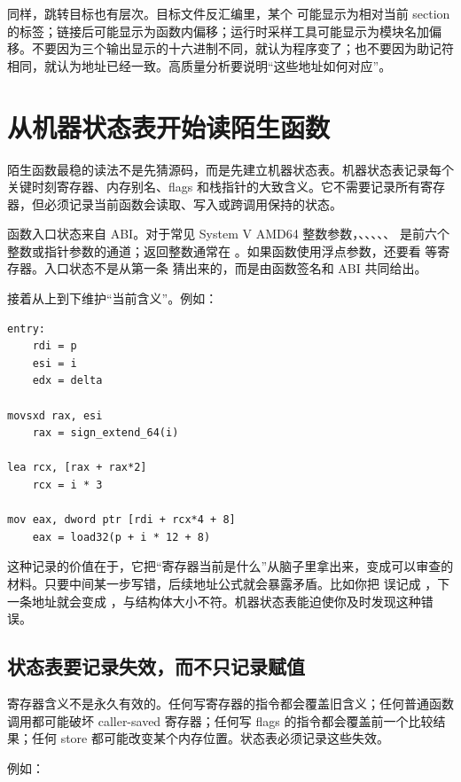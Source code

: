 同样，跳转目标也有层次。目标文件反汇编里，某个  可能显示为相对当前 section 的标签；链接后可能显示为函数内偏移；运行时采样工具可能显示为模块名加偏移。不要因为三个输出显示的十六进制不同，就认为程序变了；也不要因为助记符相同，就认为地址已经一致。高质量分析要说明“这些地址如何对应”。

\section{从机器状态表开始读陌生函数}

陌生函数最稳的读法不是先猜源码，而是先建立机器状态表。机器状态表记录每个关键时刻寄存器、内存别名、flags 和栈指针的大致含义。它不需要记录所有寄存器，但必须记录当前函数会读取、写入或跨调用保持的状态。

函数入口状态来自 ABI。对于常见 System V AMD64 整数参数，、、、、、 是前六个整数或指针参数的通道；返回整数通常在 。如果函数使用浮点参数，还要看  等寄存器。入口状态不是从第一条  猜出来的，而是由函数签名和 ABI 共同给出。

接着从上到下维护“当前含义”。例如：

\begin{lstlisting}
entry:
    rdi = p
    esi = i
    edx = delta

movsxd rax, esi
    rax = sign_extend_64(i)

lea rcx, [rax + rax*2]
    rcx = i * 3

mov eax, dword ptr [rdi + rcx*4 + 8]
    eax = load32(p + i * 12 + 8)
\end{lstlisting}

这种记录的价值在于，它把“寄存器当前是什么”从脑子里拿出来，变成可以审查的材料。只要中间某一步写错，后续地址公式就会暴露矛盾。比如你把  误记成 ，下一条地址就会变成 ，与结构体大小不符。机器状态表能迫使你及时发现这种错误。

\subsection{状态表要记录失效，而不只记录赋值}

寄存器含义不是永久有效的。任何写寄存器的指令都会覆盖旧含义；任何普通函数调用都可能破坏 caller-saved 寄存器；任何写 flags 的指令都会覆盖前一个比较结果；任何 store 都可能改变某个内存位置。状态表必须记录这些失效。

例如：

